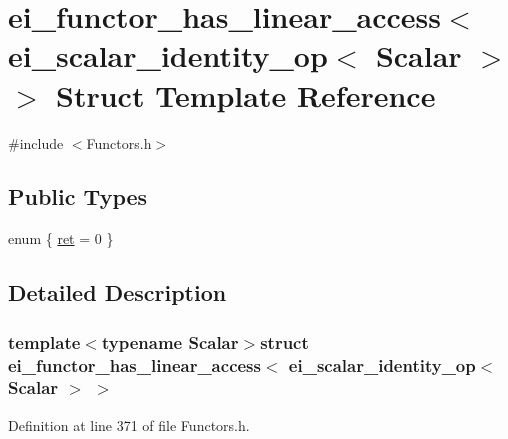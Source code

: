 \hypertarget{structei__functor__has__linear__access_3_01ei__scalar__identity__op_3_01_scalar_01_4_01_4}{\section{ei\-\_\-functor\-\_\-has\-\_\-linear\-\_\-access$<$ ei\-\_\-scalar\-\_\-identity\-\_\-op$<$ Scalar $>$ $>$ Struct Template Reference}
\label{structei__functor__has__linear__access_3_01ei__scalar__identity__op_3_01_scalar_01_4_01_4}
}


{\ttfamily \#include $<$Functors.\-h$>$}

\subsection*{Public Types}
\begin{DoxyCompactItemize}
\item 
enum \{ \hyperlink{structei__functor__has__linear__access_3_01ei__scalar__identity__op_3_01_scalar_01_4_01_4_a640adf8d82fb2690dcbd09a5f3a19ab6a85b03ff8529f31082d87d5112b7dda86}{ret} = 0
 \}
\end{DoxyCompactItemize}


\subsection{Detailed Description}
\subsubsection*{template$<$typename Scalar$>$struct ei\-\_\-functor\-\_\-has\-\_\-linear\-\_\-access$<$ ei\-\_\-scalar\-\_\-identity\-\_\-op$<$ Scalar $>$ $>$}



Definition at line 371 of file Functors.\-h.



